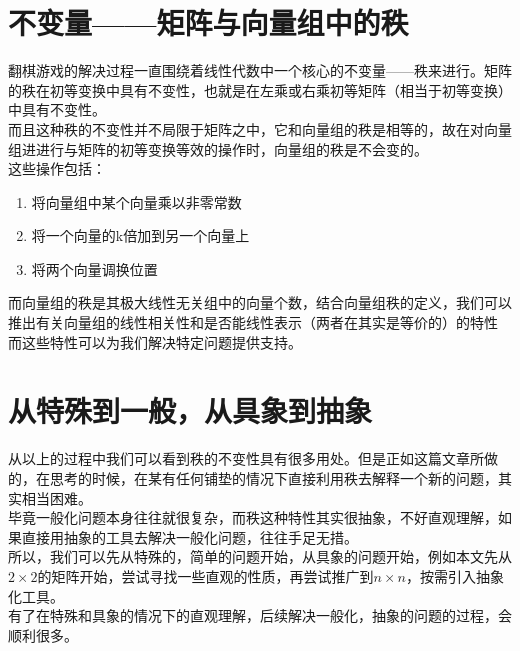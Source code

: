 \documentclass[UTF-8,a4paper]{ctexart}
\begin{document}
\section{不变量——矩阵与向量组中的秩}
翻棋游戏的解决过程一直围绕着线性代数中一个核心的不变量——秩来进行。矩阵的秩在初等变换中具有不变性，也就是在左乘或右乘初等矩阵（相当于初等变换）中具有不变性。
\\而且这种秩的不变性并不局限于矩阵之中，它和向量组的秩是相等的，故在对向量组进进行与矩阵的初等变换等效的操作时，向量组的秩是不会变的。
\\这些操作包括：
\kaishu
\begin{enumerate}
    \item 将向量组中某个向量乘以非零常数
    \item 将一个向量的k倍加到另一个向量上
    \item 将两个向量调换位置
\end{enumerate}
\songti
而向量组的秩是其极大线性无关组中的向量个数，结合向量组秩的定义，我们可以推出有关向量组的线性相关性和是否能线性表示（两者在其实是等价的）的特性
\\而这些特性可以为我们解决特定问题提供支持。
\section{从特殊到一般，从具象到抽象}
从以上的过程中我们可以看到秩的不变性具有很多用处。但是正如这篇文章所做的，在思考的时候，在某有任何铺垫的情况下直接利用秩去解释一个新的问题，其实相当困难。
\\毕竟一般化问题本身往往就很复杂，而秩这种特性其实很抽象，不好直观理解，如果直接用抽象的工具去解决一般化问题，往往手足无措。
\\所以，我们可以先从特殊的，简单的问题开始，从具象的问题开始，例如本文先从\(2 \times 2\)的矩阵开始，尝试寻找一些直观的性质，再尝试推广到\(n \times n\)，按需引入抽象化工具。
\\有了在特殊和具象的情况下的直观理解，后续解决一般化，抽象的问题的过程，会顺利很多。
\end{document}
